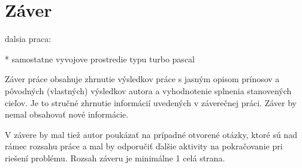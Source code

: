 
\chapter{Záver}\label{ch:summary}

dalsia praca:

* samostatne vyvojove prostredie typu turbo pascal


Záver práce obsahuje zhrnutie výsledkov práce s jasným opisom prínosov a pôvodných (vlastných) výsledkov autora a vyhodnotenie splnenia stanovených cieľov. Je to stručné zhrnutie informácií uvedených v záverečnej práci. Záver by nemal obsahovať nové informácie.

V závere by mal tiež autor poukázať na prípadné otvorené otázky, ktoré sú nad rámec rozsahu práce a mal by odporučiť ďalšie aktivity na pokračovanie pri riešení problému. Rozsah záveru je minimálne 1 celá strana.
